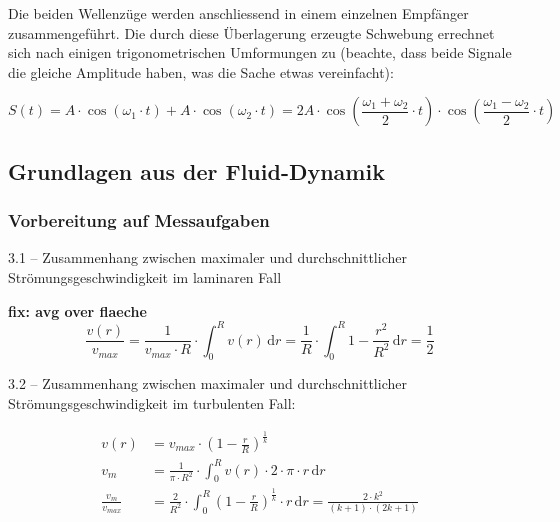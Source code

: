 Die beiden  Wellenz\"uge werden  anschliessend in einem  einzelnen Empf\"anger
zusammengef\"uhrt. Die durch diese \"Uberlagerung erzeugte Schwebung errechnet
sich  nach  einigen  trigonometrischen  Umformungen zu  (beachte,  dass  beide
Signale die gleiche Amplitude haben, was die Sache etwas vereinfacht):

\begin{equation}
    \label{eq:schwebung}
    S(t) = A \cdot \cos(\omega_1 \cdot t) + A \cdot \cos(\omega_2 \cdot t)
         = 2 A \cdot
             \cos\left(
                 \frac{\omega_1 + \omega_2}{2} \cdot t
             \right)
             \cdot
             \cos\left(
                 \frac{\omega_1 - \omega_2}{2} \cdot t
             \right)
\end{equation}

\clearpage
\subsection{Grundlagen aus der Fluid-Dynamik}
\label{subsec:fluiddynamik}

\subsubsection{Vorbereitung auf Messaufgaben}

3.1 -- Zusammenhang zwischen maximaler und durchschnittlicher Str\"omungsgeschwindigkeit im laminaren Fall

\textbf{fix: avg over flaeche}
\begin{equation}
    \label{eq:laminar:v_max:v_avg}
    \frac{v(r)}{v_{max}} = \frac{1}{v_{max} \cdot R} \cdot \int_0^R\!v(r) \, \mathrm{d}r
    = \frac{1}{R} \cdot \int_0^R \! 1 - \frac{r^2}{R^2} \, \mathrm{d}r
    = \frac{1}{2}
\end{equation}

3.2 -- Zusammenhang zwischen maximaler und durchschnittlicher Str\"omungsgeschwindigkeit im turbulenten Fall:

\begin{align}
    \label{eq:turbulent:v_max:v_avg}
    v(r) &= v_{max} \cdot \left( 1 - \frac{r}{R} \right) ^ \frac{1}{k}
    \\
    v_m &= \frac{1}{\pi \cdot R^2} \cdot \int_0^R \! v(r) \cdot 2 \cdot \pi \cdot r \, \mathrm{d}r
    \\
    \frac{v_m}{v_{max}} &= \frac{2}{R^2} \cdot \int_0^R \! \left(1 - \frac{r}{R} \right) ^ \frac{1}{k} \cdot r \, \mathrm{d}r = \frac{2 \cdot k^2}{(k + 1) \cdot (2k + 1)}
\end{align}

